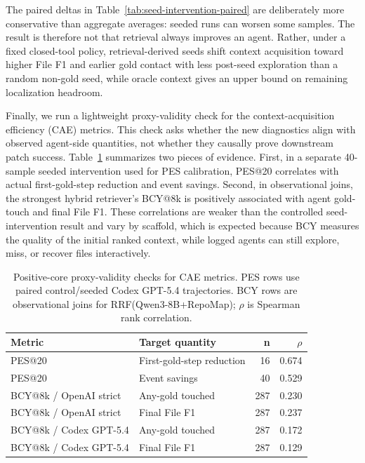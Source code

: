 \documentclass[11pt]{article}
\begin{document}
The paired deltas in Table~\ref{tab:seed-intervention-paired} are deliberately more conservative than aggregate averages: seeded runs can worsen some samples. The result is therefore not that retrieval always improves an agent. Rather, under a fixed closed-tool policy, retrieval-derived seeds shift context acquisition toward higher File F1 and earlier gold contact with less post-seed exploration than a random non-gold seed, while oracle context gives an upper bound on remaining localization headroom.

Finally, we run a lightweight proxy-validity check for the context-acquisition efficiency (CAE) metrics. This check asks whether the new diagnostics align with observed agent-side quantities, not whether they causally prove downstream patch success. Table~\ref{tab:cae-validity} summarizes two pieces of evidence. First, in a separate 40-sample seeded intervention used for PES calibration, PES@20 correlates with actual first-gold-step reduction and event savings. Second, in observational joins, the strongest hybrid retriever's BCY@8k is positively associated with agent gold-touch and final File F1. These correlations are weaker than the controlled seed-intervention result and vary by scaffold, which is expected because BCY measures the quality of the initial ranked context, while logged agents can still explore, miss, or recover files interactively.

\begin{table}[t]
\centering
\caption{Positive-core proxy-validity checks for CAE metrics. PES rows use paired control/seeded Codex GPT-5.4 trajectories. BCY rows are observational joins for RRF(Qwen3-8B+RepoMap); \(\rho\) is Spearman rank correlation.}
\label{tab:cae-validity}
\begin{tabular}{llrr}
\toprule
Metric & Target quantity & n & \(\rho\) \\
\midrule
PES@20 & First-gold-step reduction & 16 & 0.674 \\
PES@20 & Event savings & 40 & 0.529 \\
BCY@8k / OpenAI strict & Any-gold touched & 287 & 0.230 \\
BCY@8k / OpenAI strict & Final File F1 & 287 & 0.237 \\
BCY@8k / Codex GPT-5.4 & Any-gold touched & 287 & 0.172 \\
BCY@8k / Codex GPT-5.4 & Final File F1 & 287 & 0.129 \\
\bottomrule
\end{tabular}
\end{table}
\end{document}
